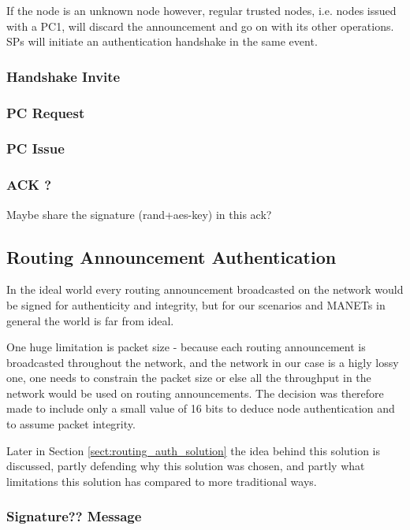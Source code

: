 If the node is an unknown node however, regular trusted nodes, i.e. nodes issued
with a \ac{PC1}, will discard the announcement and go on with its other
operations. \acp{SP} will initiate an authentication handshake in the same
event.

\subsubsection*{Handshake Invite}

\subsubsection*{\acf{PC} Request}

\subsubsection*{\acf{PC} Issue}

\subsubsection*{ACK ?}
Maybe share the signature (rand+aes-key) in this ack?



\subsection{Routing Announcement Authentication}
In the ideal world every routing announcement broadcasted on the network would
be signed for authenticity and integrity, but for our scenarios and \acp{MANET}
in general the world is far from ideal.

One huge limitation is packet size - because each routing announcement is
broadcasted throughout the network, and the network in our case is a higly lossy
one, one needs to constrain the packet size or else all the throughput in the
network would be used on routing announcements. The decision was therefore made to
include only a small value of 16 bits to deduce node authentication and to
assume packet integrity.

Later in Section \ref{sect:routing_auth_solution} the idea  behind this
solution is discussed, partly defending why this solution was chosen, and partly
what limitations this solution has compared to more traditional ways.

\subsubsection*{Signature?? Message}

